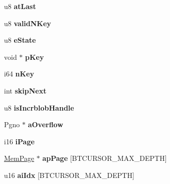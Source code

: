 \begin{DoxyCompactItemize}
\item 
\hypertarget{struct_bt_cursor_afff41eb594a5fc2c20b13232e6ff9689}{u8 {\bfseries at\-Last}}\label{struct_bt_cursor_afff41eb594a5fc2c20b13232e6ff9689}

\item 
\hypertarget{struct_bt_cursor_a7b64ef18751d3076484903e9e9e05098}{u8 {\bfseries valid\-N\-Key}}\label{struct_bt_cursor_a7b64ef18751d3076484903e9e9e05098}

\item 
\hypertarget{struct_bt_cursor_a30ab5e7109965b34a08562a7b7e6de15}{u8 {\bfseries e\-State}}\label{struct_bt_cursor_a30ab5e7109965b34a08562a7b7e6de15}

\item 
\hypertarget{struct_bt_cursor_a3c979824f27f63678d7a2b02311bc330}{void $\ast$ {\bfseries p\-Key}}\label{struct_bt_cursor_a3c979824f27f63678d7a2b02311bc330}

\item 
\hypertarget{struct_bt_cursor_a23f6a271258c109aaeda0ba19e808f92}{i64 {\bfseries n\-Key}}\label{struct_bt_cursor_a23f6a271258c109aaeda0ba19e808f92}

\item 
\hypertarget{struct_bt_cursor_ab1dfdbd6c9ec6cdb21cdb5deaa6d5ecb}{int {\bfseries skip\-Next}}\label{struct_bt_cursor_ab1dfdbd6c9ec6cdb21cdb5deaa6d5ecb}

\item 
\hypertarget{struct_bt_cursor_a539dc1beff0ec303cfd4c94c274c7a9b}{u8 {\bfseries is\-Incrblob\-Handle}}\label{struct_bt_cursor_a539dc1beff0ec303cfd4c94c274c7a9b}

\item 
\hypertarget{struct_bt_cursor_ae2dbcc15e63d349774a7ad6caef4d096}{Pgno $\ast$ {\bfseries a\-Overflow}}\label{struct_bt_cursor_ae2dbcc15e63d349774a7ad6caef4d096}

\item 
\hypertarget{struct_bt_cursor_ad4362a71baf655b0957a02324586853b}{i16 {\bfseries i\-Page}}\label{struct_bt_cursor_ad4362a71baf655b0957a02324586853b}

\item 
\hypertarget{struct_bt_cursor_ad3414d944f9578e86e26c6158f92096b}{\hyperlink{struct_mem_page}{Mem\-Page} $\ast$ {\bfseries ap\-Page} \mbox{[}B\-T\-C\-U\-R\-S\-O\-R\-\_\-\-M\-A\-X\-\_\-\-D\-E\-P\-T\-H\mbox{]}}\label{struct_bt_cursor_ad3414d944f9578e86e26c6158f92096b}

\item 
\hypertarget{struct_bt_cursor_a037a739198de5bee22ca203d34e90af1}{u16 {\bfseries ai\-Idx} \mbox{[}B\-T\-C\-U\-R\-S\-O\-R\-\_\-\-M\-A\-X\-\_\-\-D\-E\-P\-T\-H\mbox{]}}\label{struct_bt_cursor_a037a739198de5bee22ca203d34e90af1}

\end{DoxyCompactItemize}


